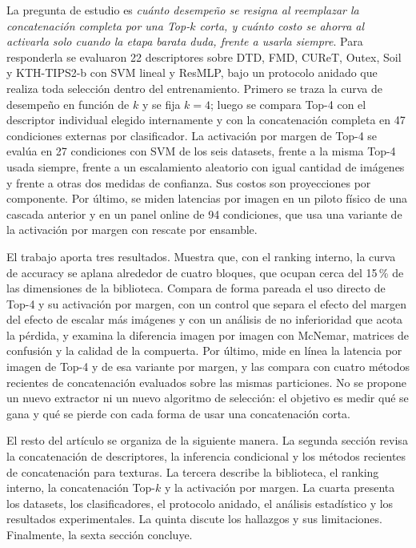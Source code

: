 \documentclass[a4paper,fleqn]{cas-sc}
\begin{document}
La pregunta de estudio es \emph{cuánto desempeño se resigna al reemplazar la concatenación completa por una Top-$k$ corta, y cuánto costo se ahorra al activarla solo cuando la etapa barata duda, frente a usarla siempre}. Para responderla se evaluaron 22 descriptores sobre DTD, FMD, CUReT, Outex, Soil y KTH-TIPS2-b con SVM lineal y ResMLP, bajo un protocolo anidado que realiza toda selección dentro del entrenamiento. Primero se traza la curva de desempeño en función de $k$ y se fija $k=4$; luego se compara Top-4 con el descriptor individual elegido internamente y con la concatenación completa en 47 condiciones externas por clasificador. La activación por margen de Top-4 se evalúa en 27 condiciones con SVM de los seis datasets, frente a la misma Top-4 usada siempre, frente a un escalamiento aleatorio con igual cantidad de imágenes y frente a otras dos medidas de confianza. Sus costos son proyecciones por componente. Por último, se miden latencias por imagen en un piloto físico de una cascada anterior y en un panel online de 94 condiciones, que usa una variante de la activación por margen con rescate por ensamble.

El trabajo aporta tres resultados. Muestra que, con el ranking interno, la curva de accuracy se aplana alrededor de cuatro bloques, que ocupan cerca del 15\,\% de las dimensiones de la biblioteca. Compara de forma pareada el uso directo de Top-4 y su activación por margen, con un control que separa el efecto del margen del efecto de escalar más imágenes y con un análisis de no inferioridad que acota la pérdida, y examina la diferencia imagen por imagen con McNemar, matrices de confusión y la calidad de la compuerta. Por último, mide en línea la latencia por imagen de Top-4 y de esa variante por margen, y las compara con cuatro métodos recientes de concatenación evaluados sobre las mismas particiones. No se propone un nuevo extractor ni un nuevo algoritmo de selección: el objetivo es medir qué se gana y qué se pierde con cada forma de usar una concatenación corta.

El resto del artículo se organiza de la siguiente manera. La segunda sección revisa la concatenación de descriptores, la inferencia condicional y los métodos recientes de concatenación para texturas. La tercera describe la biblioteca, el ranking interno, la concatenación Top-$k$ y la activación por margen. La cuarta presenta los datasets, los clasificadores, el protocolo anidado, el análisis estadístico y los resultados experimentales. La quinta discute los hallazgos y sus limitaciones. Finalmente, la sexta sección concluye.
\end{document}
